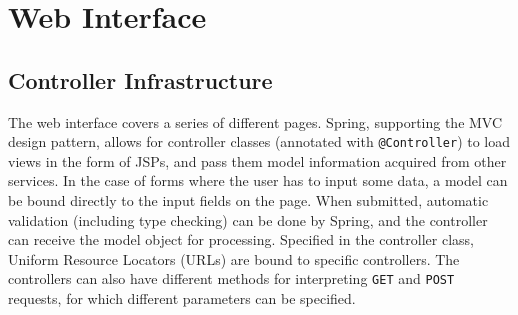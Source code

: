 \section{Web Interface}
\subsection*{Controller Infrastructure}
The web interface covers a series of different pages. Spring, supporting the MVC design pattern, allows for controller classes (annotated with \texttt{@Controller}) to load views in the form of JSPs, and pass them model information acquired from other services. In the case of forms where the user has to input some data, a model can be bound directly to the input fields on the page. When submitted, automatic validation (including type checking) can be done by Spring, and the controller can receive the model object for processing. Specified in the controller class, Uniform Resource Locators (URLs) are bound to specific controllers. The controllers can also have different methods for interpreting \texttt{GET} and \texttt{POST} requests, for which different parameters can be specified.

